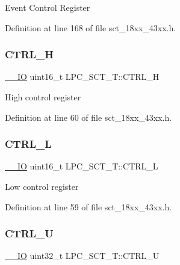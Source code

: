 Event Control Register 

Definition at line 168 of file sct\+\_\+18xx\+\_\+43xx.\+h.

\mbox{\label{struct_l_p_c___s_c_t___t_ae37ee187622ee3e64dc243adb94e80fb}} 
\subsubsection{\texorpdfstring{C\+T\+R\+L\+\_\+H}{CTRL\_H}}
{\footnotesize\ttfamily \hyperlink{core__sc300_8h_aec43007d9998a0a0e01faede4133d6be}{\+\_\+\+\_\+\+IO} uint16\+\_\+t L\+P\+C\+\_\+\+S\+C\+T\+\_\+\+T\+::\+C\+T\+R\+L\+\_\+H}

High control register 

Definition at line 60 of file sct\+\_\+18xx\+\_\+43xx.\+h.

\mbox{\label{struct_l_p_c___s_c_t___t_a1c3f4fdf16a920ff77d676a0cc35e199}} 
\subsubsection{\texorpdfstring{C\+T\+R\+L\+\_\+L}{CTRL\_L}}
{\footnotesize\ttfamily \hyperlink{core__sc300_8h_aec43007d9998a0a0e01faede4133d6be}{\+\_\+\+\_\+\+IO} uint16\+\_\+t L\+P\+C\+\_\+\+S\+C\+T\+\_\+\+T\+::\+C\+T\+R\+L\+\_\+L}

Low control register 

Definition at line 59 of file sct\+\_\+18xx\+\_\+43xx.\+h.

\mbox{\label{struct_l_p_c___s_c_t___t_a4e3bf94731abfdd323b6faffc7122090}} 
\subsubsection{\texorpdfstring{C\+T\+R\+L\+\_\+U}{CTRL\_U}}
{\footnotesize\ttfamily \hyperlink{core__sc300_8h_aec43007d9998a0a0e01faede4133d6be}{\+\_\+\+\_\+\+IO} uint32\+\_\+t L\+P\+C\+\_\+\+S\+C\+T\+\_\+\+T\+::\+C\+T\+R\+L\+\_\+U}

